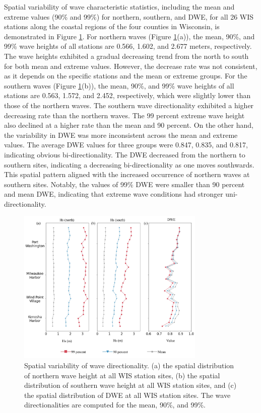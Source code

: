 Spatial variability of wave characteristic statistics, including the mean and
extreme values (90\% and 99\%) for northern, southern, and DWE, for all 26 WIS
stations along the coastal regions of the four counties in Wisconsin, is
demonstrated in Figure \ref{fig:fig3.7}. For northern waves (Figure
\ref{fig:fig3.7}(a)), the mean, 90\%, and 99\% wave heights of all stations are
0.566, 1.602, and 2.677 meters, respectively. The wave heights exhibited a
gradual decreasing trend from the north to south for both mean and extreme
values. However, the decrease rate was not consistent, as it depends on the
specific stations and the mean or extreme groups. For the southern waves (Figure
\ref{fig:fig3.7}(b)), the mean, 90\%, and 99\% wave heights of all stations are
0.563, 1.572, and 2.452, respectively, which were slightly lower than those of
the northern waves. The southern wave directionality exhibited a higher
decreasing rate than the northern waves. The 99 percent extreme wave height also
declined at a higher rate than the mean and 90 percent. On the other hand, the
variability in DWE was more inconsistent across the mean and extreme values. The
average DWE values for three groups were 0.847, 0.835, and 0.817, indicating
obvious bi-directionality. The DWE decreased from the northern to southern
sites, indicating a decreasing bi-directionality as one moves southwards. This
spatial pattern aligned with the increased occurrence of northern waves at
southern sites. Notably, the values of 99\% DWE were smaller than 90 percent and
mean DWE, indicating that extreme wave conditions had stronger
uni-directionality. 

\begin{figure}[htbp]
  \centering
  \includegraphics[width=0.8\textwidth]{chapter3/resources/figure3-7.jpg}
  \caption{Spatial variability of wave directionality. (a) the spatial distribution of northern wave height at all WIS station sites, (b) the spatial distribution of southern wave height at all WIS station sites, and (c) the spatial distribution of DWE at all WIS station sites. The wave directionalities are computed for the mean, 90$\%$, and 99$\%$.}
  \label{fig:fig3.7}
\end{figure}


